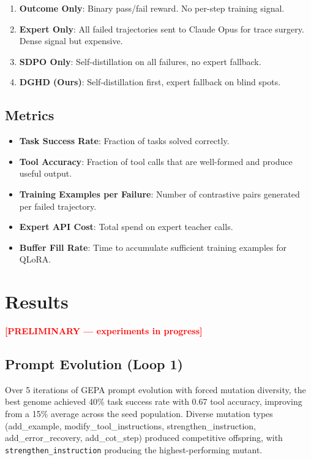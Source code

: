 \documentclass[11pt]{article}
\newcommand{\ours}{DGHD}
\begin{document}
\begin{enumerate}
    \item \textbf{Outcome Only}: Binary pass/fail reward. No per-step training signal.
    \item \textbf{Expert Only}: All failed trajectories sent to Claude Opus for trace surgery. Dense signal but expensive.
    \item \textbf{SDPO Only}: Self-distillation on all failures, no expert fallback.
    \item \textbf{\ours{} (Ours)}: Self-distillation first, expert fallback on blind spots.
\end{enumerate}

\subsection{Metrics}

\begin{itemize}
    \item \textbf{Task Success Rate}: Fraction of tasks solved correctly.
    \item \textbf{Tool Accuracy}: Fraction of tool calls that are well-formed and produce useful output.
    \item \textbf{Training Examples per Failure}: Number of contrastive pairs generated per failed trajectory.
    \item \textbf{Expert API Cost}: Total spend on expert teacher calls.
    \item \textbf{Buffer Fill Rate}: Time to accumulate sufficient training examples for QLoRA.
\end{itemize}

\section{Results}
\label{sec:results}

\textcolor{red}{\textbf{[PRELIMINARY --- experiments in progress]}}

\subsection{Prompt Evolution (Loop 1)}

Over 5 iterations of GEPA prompt evolution with forced mutation diversity, the best genome achieved 40\% task success rate with 0.67 tool accuracy, improving from a 15\% average across the seed population. Diverse mutation types (add\_example, modify\_tool\_instructions, strengthen\_instruction, add\_error\_recovery, add\_cot\_step) produced competitive offspring, with \texttt{strengthen\_instruction} producing the highest-performing mutant.
\end{document}
